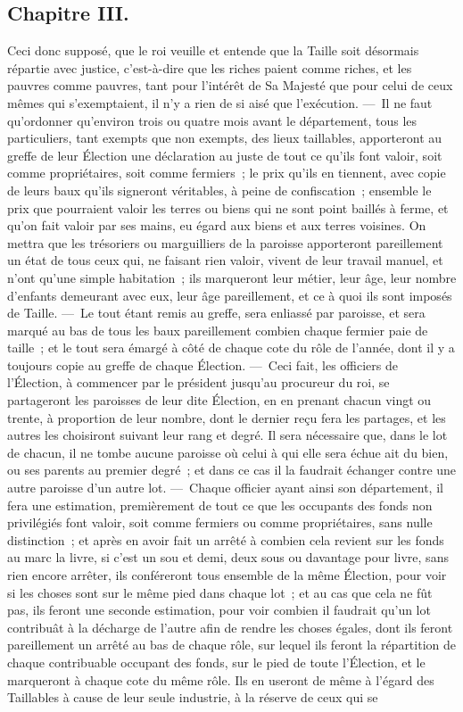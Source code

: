 \documentclass[french,twoside]{book} %
\begin{document}
\subsection[{Chapitre III.}]{Chapitre III.}
\noindent Ceci donc supposé, que le roi veuille et entende que la Taille soit désormais répartie avec justice, c’est-à-dire que les riches paient comme riches, et les pauvres comme pauvres, tant pour l’intérêt de Sa Majesté que pour celui de ceux mêmes qui s’exemptaient, il n’y a rien de si aisé que l’exécution. — Il ne faut qu’ordonner qu’environ trois ou quatre mois avant le département, tous les particuliers, tant exempts que non exempts, des lieux taillables, apporteront au greffe de leur Élection une déclaration au juste de tout ce qu’ils font valoir, soit comme propriétaires, soit comme fermiers ; le prix qu’ils en tiennent, avec copie de leurs baux qu’ils signeront véritables, à peine de confiscation ; ensemble le prix que pourraient valoir les terres ou biens qui ne sont point baillés à ferme, et qu’on fait valoir par ses mains, eu égard aux biens et aux terres voisines. On mettra que les trésoriers ou marguilliers de la paroisse apporteront pareillement un état de tous ceux qui, ne faisant rien valoir, vivent de leur travail manuel, et n’ont qu’une simple habitation ; ils marqueront leur métier, leur âge, leur nombre d’enfants demeurant avec eux, leur âge pareillement, et ce à quoi ils sont imposés de Taille. — Le tout étant remis au greffe, sera enliassé par paroisse, et sera marqué au bas de tous les baux pareillement combien chaque fermier paie de taille ; et le tout sera émargé à côté de chaque cote du rôle de l’année, dont il y a toujours copie au greffe de chaque Élection. — Ceci fait, les officiers de l’Élection, à commencer par le président jusqu’au procureur du roi, se partageront les paroisses de leur dite Élection, en en prenant chacun vingt ou trente, à proportion de leur nombre, dont le dernier reçu fera les partages, et les autres les choisiront suivant leur rang et degré. Il sera nécessaire que, dans le lot de chacun, il ne tombe aucune paroisse où celui à qui elle sera échue ait du bien, ou ses parents au premier degré ; et dans ce cas il la faudrait échanger contre une autre paroisse d’un autre lot. — Chaque officier ayant ainsi son département, il fera une estimation, premièrement de tout ce que les occupants des fonds non privilégiés font valoir, soit comme fermiers ou comme propriétaires, sans nulle distinction ; et après en avoir fait un arrêté à combien cela revient sur les fonds au marc la livre, si c’est un sou et demi, deux sous ou davantage pour livre, sans rien encore arrêter, ils conféreront tous ensemble de la même Élection, pour voir si les choses sont sur le même pied dans chaque lot ; et au cas que cela ne fût pas, ils feront une seconde estimation, pour voir combien il faudrait qu’un lot contribuât à la décharge de l’autre afin de rendre les choses égales, dont ils feront pareillement un arrêté au bas de chaque rôle, sur lequel ils feront la répartition de chaque contribuable occupant des fonds, sur le pied de toute l’Élection, et le marqueront à chaque cote du même rôle. Ils en useront de même à l’égard des Taillables à cause de leur seule industrie, à la réserve de ceux qui se 
\end{document}
